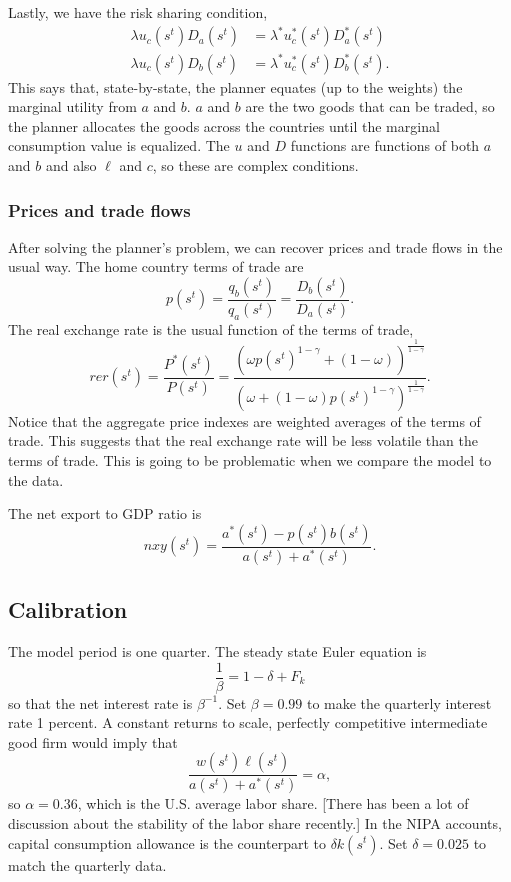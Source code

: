 \documentclass[11pt,pdftex,twoside,letterpaper]{exam}
\begin{document}
Lastly, we have the risk sharing condition,
\begin{align}
  \lambda u_c(s^t)D_a(s^t) &= \lambda^*u_c^*(s^t)D_a^*(s^t)\\
  \lambda u_c(s^t)D_b(s^t) &= \lambda^*u_c^*(s^t)D_b^*(s^t).
\end{align}
This says that, state-by-state, the planner equates (up to the weights) the marginal utility from $a$ and $b$. $a$ and $b$ are the two goods that can be traded, so the planner allocates the goods across the countries until the marginal consumption value is equalized. The $u$ and $D$ functions are functions of both $a$ and $b$ and also $\ell$ and $c$, so these are complex conditions.

\subsubsection*{Prices and trade flows}
After solving the planner's problem, we can recover prices and trade flows in the usual way. The home country terms of trade are
\begin{equation}
  p(s^t)=\frac{q_b(s^t)}{q_a(s^t)}=\frac{D_b(s^t)}{D_a(s^t)}.
\end{equation}
The real exchange rate is the usual function of the terms of trade,
\begin{equation}
  rer(s^t) = \frac{P^*(s^t)}{P(s^t)}=\frac{\left( \omega p(s^t)^{1-\gamma}+(1-\omega) \right)^\frac{1}{1-\gamma}}{\left( \omega +(1-\omega)p(s^t)^{1-\gamma} \right)^\frac{1}{1-\gamma}}.
\end{equation}
Notice that the aggregate price indexes are weighted averages of the terms of trade. This suggests that the real exchange rate will be less volatile than the terms of trade. This is going to be problematic when we compare the model to the data.

The net export to GDP ratio is
\begin{equation}
  nxy(s^t)=\frac{a^*(s^t)-p(s^t)b(s^t)}{a(s^t)+a^*(s^t)}.
\end{equation}
\subsection{Calibration}
The model period is one quarter. The steady state Euler equation is
\begin{equation}\label{}
  \frac{1}{\beta} = 1-\delta+F_k
\end{equation}
so that the net interest rate is $\beta^{-1}$. Set $\beta=0.99$ to make the quarterly interest rate 1 percent. A constant returns to scale, perfectly competitive intermediate good firm would imply that
\begin{equation}
  \frac{w(s^t)\ell(s^t)}{a(s^t)+a^*(s^t)}=\alpha,
\end{equation}
so $\alpha=0.36$, which is the U.S. average labor share. [There has been a lot of discussion about the stability of the labor share recently.] In the NIPA accounts, capital consumption allowance is the counterpart to $\delta k(s^t)$. Set $\delta=0.025$ to match the quarterly data.
\end{document}
